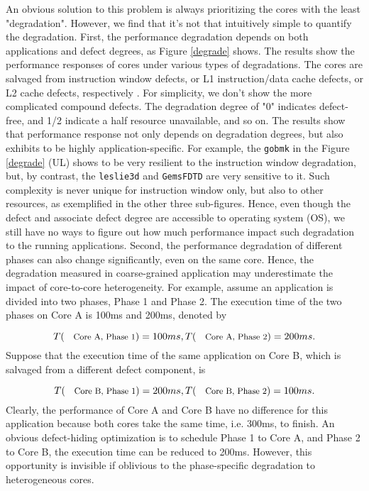 An obvious solution to this problem is always prioritizing the cores with the least "degradation". However, we find that it's not that intuitively simple to  quantify the degradation. First, the performance degradation depends on both applications and defect degrees, as Figure \ref{degrade} shows. The results show the performance responses of cores under various types of degradations. The cores are salvaged from instruction window defects, or L1 instruction/data cache defects, or L2 cache defects, respectively \cite{salvaging}. For simplicity, we don't show the more complicated compound defects. The degradation degree of "0" indicates defect-free, and 1/2  indicate a half resource unavailable, and so on. The results show that  performance response not only depends on degradation degrees, but also exhibits to be highly application-specific. For example, the \texttt{gobmk} in the Figure \ref{degrade} (UL) shows to be very resilient to the instruction window degradation, but, by contrast, the \texttt{leslie3d} and \texttt{GemsFDTD} are very sensitive to it. Such complexity is never unique for instruction window only, but also to other resources, as exemplified in the other three sub-figures. Hence, even though the defect and associate defect degree are accessible to operating system (OS), we still have no ways to figure out how much performance impact such degradation to the running applications. Second, the performance degradation of different phases can also change significantly, even on the same core. Hence, the degradation measured in coarse-grained application may underestimate the impact of core-to-core heterogeneity. For example, assume an application is divided into two phases, Phase 1 and Phase 2. The execution time of the two phases on Core A is 100ms and 200ms, denoted by

\begin{equation}\nonumber
    T(\text{\footnotesize{Core A, Phase 1}})=100ms, T(\text{\footnotesize{Core A, Phase 2}})=200ms. 
\end{equation}
Suppose that the execution time of the same application on Core B, which is salvaged from a different defect component,   is

\begin{equation}\nonumber
    T(\text{\footnotesize{Core B, Phase 1}})=200ms, T(\text{\footnotesize{Core B, Phase 2}})=100ms. 
\end{equation}
Clearly, the performance of Core A and Core B have no difference for this application because both cores take  the same time, i.e. 300ms,  to finish. An obvious defect-hiding optimization is to schedule Phase 1 to Core A, and Phase 2 to Core B, the execution time can be reduced to 200ms. However, this opportunity is invisible if oblivious to the phase-specific degradation to heterogeneous cores.

